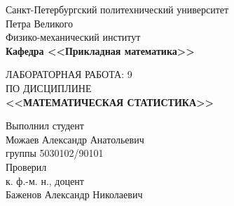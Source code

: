 \documentclass[main.tex]{subfiles}
\begin{document}
\begin{titlepage}
\begin{center}
	\begin{large}
		Санкт-Петербургский политехнический университет\\ Петра Великого\\		
		\vspace{\baselineskip}
		Физико-механический институт\\
		\textbf{Кафедра <<Прикладная математика>>}\\
	\end{large}
	\vfill
	\Large{{ЛАБОРАТОРНАЯ РАБОТА: 9
	\\ {ПО ДИСЦИПЛИНЕ} \\\textbf{<<МАТЕМАТИЧЕСКАЯ СТАТИСТИКА>>}}}
\end{center}
\vfill
\begin{flushright}	
	Выполнил студент\\
	Можаев Александр Анатольевич\\
	группы 5030102/90101\\
	\vspace{\baselineskip}	
	Проверил\\
	к. ф.-м. н., доцент\\
	Баженов Александр Николаевич
\end{flushright}
\vfill
{}
\end{titlepage}
\end{document}
